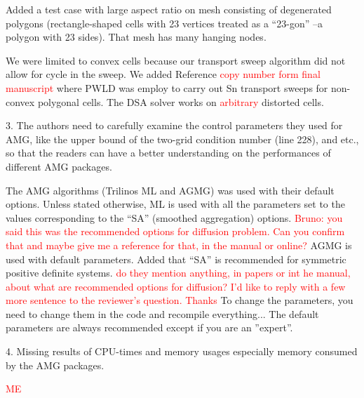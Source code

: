 \documentclass{article}
\begin{document}
Added a test case with large aspect ratio on mesh consisting of degenerated polygons (rectangle-shaped cells with 23 vertices treated as a ``23-gon'' --a polygon with 23 sides). That mesh has many hanging nodes.

We were limited to convex cells because our transport sweep algorithm did not allow for cycle in the sweep. We added Reference \textcolor{red}{copy number form final manuscript} where PWLD was employ to carry out Sn transport sweeps for non-convex polygonal cells. The DSA solver works on \textcolor{red}{arbitrary} distorted cells.

\bigskip


{
\color{blue}
3. The authors need to carefully examine the control parameters they used for AMG, like the upper bound of the two-grid condition number (line 228), and etc., so that the readers can have a better understanding on the performances of different AMG packages.
}

The AMG algorithms (Trilinos ML and AGMG) was used with their default options. Unless stated otherwise, ML is
used with all the parameters set to the values corresponding to the ``SA'' (smoothed aggregation) options. 
\textcolor{red}{Bruno: you said this was the recommended options for diffusion problem. Can you confirm that and maybe give me a reference for that, in the manual or online?} 
AGMG is used with default parameters. Added that ``SA'' is recommended for
symmetric positive definite systems. \textcolor{red}{do they mention anything, in papers or int he manual, about what are recommended options for diffusion? I'd like to reply with a few more sentence to the reviewer's question. Thanks}
To change the parameters, you need to change them in the code and recompile
everything... The default parameters are always recommended except if you are an
''expert''.


\bigskip


{
\color{blue}
4. Missing results of CPU-times and memory usages especially memory consumed by the AMG packages.
}


\textcolor{red}{ME}

\bigskip
\end{document}
